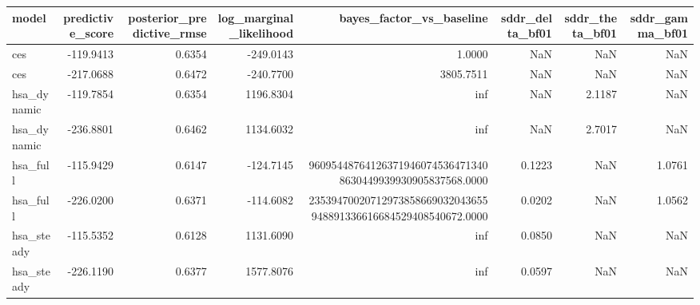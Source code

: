 \begin{tabular}{lrrrrrrr}
\toprule
model & predictive\_score & posterior\_predictive\_rmse & log\_marginal\_likelihood & bayes\_factor\_vs\_baseline & sddr\_delta\_bf01 & sddr\_theta\_bf01 & sddr\_gamma\_bf01 \\
\midrule
ces & -119.9413 & 0.6354 & -249.0143 & 1.0000 & NaN & NaN & NaN \\
ces & -217.0688 & 0.6472 & -240.7700 & 3805.7511 & NaN & NaN & NaN \\
hsa\_dynamic & -119.7854 & 0.6354 & 1196.8304 & inf & NaN & 2.1187 & NaN \\
hsa\_dynamic & -236.8801 & 0.6462 & 1134.6032 & inf & NaN & 2.7017 & NaN \\
hsa\_full & -115.9429 & 0.6147 & -124.7145 & 960954487641263719460745364713408630449939930905837568.0000 & 0.1223 & NaN & 1.0761 \\
hsa\_full & -226.0200 & 0.6371 & -114.6082 & 23539470020712973858669032043655948891336616684529408540672.0000 & 0.0202 & NaN & 1.0562 \\
hsa\_steady & -115.5352 & 0.6128 & 1131.6090 & inf & 0.0850 & NaN & NaN \\
hsa\_steady & -226.1190 & 0.6377 & 1577.8076 & inf & 0.0597 & NaN & NaN \\
\bottomrule
\end{tabular}
